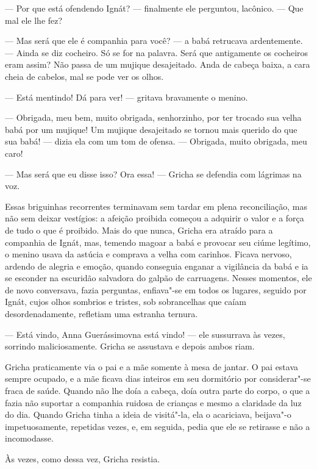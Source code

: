 --- Por que está ofendendo Ignát? --- finalmente ele perguntou,
lacônico. --- Que mal ele lhe fez?

--- Mas será que ele é companhia para você? --- a babá retrucava
ardentemente. --- Ainda se diz cocheiro. Só se for na palavra. Será que
antigamente os cocheiros eram assim? Não passa de um mujique
desajeitado. Anda de cabeça baixa, a cara cheia de cabelos, mal se pode
ver os olhos.

--- Está mentindo! Dá para ver! --- gritava bravamente o menino.

--- Obrigada, meu bem, muito obrigada, senhorzinho, por ter trocado sua
velha babá por um mujique! Um mujique desajeitado se tornou mais querido
do que sua babá! --- dizia ela com um tom de ofensa. --- Obrigada, muito
obrigada, meu caro!

--- Mas será que eu disse isso? Ora essa! --- Gricha se defendia com
lágrimas na voz.

Essas briguinhas recorrentes terminavam sem tardar em plena
reconciliação, mas não sem deixar vestígios: a afeição proibida começou
a adquirir o valor e a força de tudo o que é proibido. Mais do que
nunca, Gricha era atraído para a companhia de Ignát, mas, temendo magoar
a babá e provocar seu ciúme legítimo, o menino usava da astúcia e
comprava a velha com carinhos. Ficava nervoso, ardendo de alegria e
emoção, quando conseguia enganar a vigilância da babá e ia se esconder
na escuridão salvadora do galpão de carruagens. Nesses momentos, ele de
novo conversava, fazia perguntas, enfiava"-se em todos os lugares,
seguido por Ignát, cujos olhos sombrios e tristes, sob sobrancelhas que
caíam desordenadamente, refletiam uma estranha ternura.

--- Está vindo, Anna Guerássimovna está vindo! --- ele sussurrava às
vezes, sorrindo maliciosamente. Gricha se assustava e depois ambos riam.

\asterisc

Gricha praticamente via o pai e a mãe somente à mesa de jantar. O pai
estava sempre ocupado, e a mãe ficava dias inteiros em seu dormitório
por considerar"-se fraca de saúde. Quando não lhe doía a cabeça, doía
outra parte do corpo, o que a fazia não suportar a companhia ruidosa de
crianças e mesmo a claridade da luz do dia. Quando Gricha tinha a ideia
de visitá"-la, ela o acariciava, beijava"-o impetuosamente, repetidas
vezes, e, em seguida, pedia que ele se retirasse e não a incomodasse.

Às vezes, como dessa vez, Gricha resistia.

